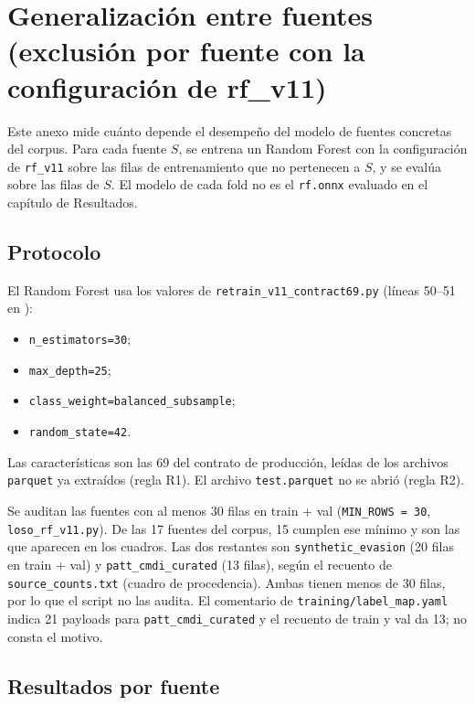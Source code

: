 \section{Generalización entre fuentes (exclusión por fuente con la configuración de rf\_v11)}\label{anexo:loso}

Este anexo mide cuánto depende el desempeño del modelo de fuentes concretas del corpus. Para cada fuente $S$, se entrena un Random Forest con la configuración de \texttt{rf\_v11} sobre las filas de entrenamiento que no pertenecen a $S$, y se evalúa sobre las filas de $S$. El modelo de cada fold no es el \texttt{rf.onnx} evaluado en el capítulo de Resultados.

\subsection{Protocolo}\label{anexo:loso-protocolo}

El Random Forest usa los valores de \texttt{retrain\_v11\_contract69.py} (líneas 50--51 en ):

\begin{itemize}
\item \texttt{n\_estimators=30};
\item \texttt{max\_depth=25};
\item \texttt{class\_weight=balanced\_subsample};
\item \texttt{random\_state=42}.
\end{itemize} Las características son las 69 del contrato de producción, leídas de los archivos \texttt{parquet} ya extraídos (regla R1). El archivo \texttt{test.parquet} no se abrió (regla R2).

Se auditan las fuentes con al menos 30 filas en train + val (\texttt{MIN\_ROWS = 30}, \texttt{loso\_rf\_v11.py}). De las 17 fuentes del corpus, 15 cumplen ese mínimo y son las que aparecen en los cuadros. Las dos restantes son \texttt{synthetic\_evasion} (20 filas en train + val) y \texttt{patt\_cmdi\_curated} (13 filas), según el recuento de \texttt{source\_counts.txt} (cuadro de procedencia). Ambas tienen menos de 30 filas, por lo que el script no las audita. El comentario de \texttt{training/label\_map.yaml} indica 21 payloads para \texttt{patt\_cmdi\_curated} y el recuento de train y val da 13; no consta el motivo.

\subsection{Resultados por fuente}\label{anexo:loso-resultados}


